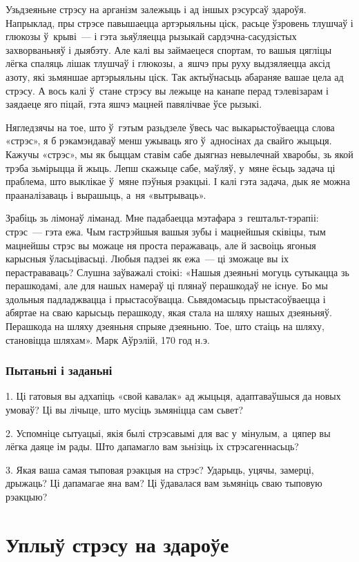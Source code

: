 Узьдзеяньне стрэсу на арганізм залежыць і ад іншых рэсурсаў здароўя. Напрыклад, пры стрэсе павышаецца артэрыяльны ціск, расьце ўзровень тлушчаў і глюкозы ў~крыві~--- і гэта зьяўляецца рызыкай сардэчна-сасудзістых захворваньняў і дыябэту. Але калі вы займаецеся спортам, то вашыя цягліцы лёгка спаляць лішак тлушчаў і глюкозы, а~яшчэ пры руху выдзяляецца аксід азоту, які зьмяншае артэрыяльны ціск. Так актыўнасьць абараняе вашае цела ад стрэсу. А вось калі ў~стане стрэсу вы лежыце на канапе перад тэлевізарам і заядаеце яго піцай, гэта яшчэ мацней павялічвае ўсе рызыкі.

Нягледзячы на тое, што ў~гэтым разьдзеле ўвесь час выкарыстоўваецца слова «стрэс», я б рэкамэндаваў менш ужываць яго ў~адносінах да свайго жыцьця. Кажучы «стрэс», мы як быццам ставім сабе дыягназ невылечнай хваробы, зь якой трэба зьмірыцца й жыць. Лепш скажыце сабе, маўляў, у~мяне ёсьць задача ці праблема, што выклікае ў~мяне пэўныя рэакцыі. І калі гэта задача, дык яе можна прааналізаваць і вырашыць, а~ня «вытрываць».

Зрабіць зь лімонаў ліманад. Мне падабаецца мэтафара з~гештальт-тэрапіі: стрэс~--- гэта ежа. Чым гастрэйшыя вашыя зубы і мацнейшыя сківіцы, тым мацнейшы стрэс вы можаце ня проста перажаваць, але й засвоіць ягоныя карысныя ўласьцівасьці. Любыя падзеі як ежа~--- ці зможаце вы іх перастрававаць? Слушна заўважалі стоікі: «Нашыя дзеяньні могуць сутыкацца зь перашкодамі, але для нашых намераў ці плянаў перашкодаў не існуе. Бо мы здольныя падладжвацца і прыстасоўвацца. Сьвядомасьць прыстасоўваецца і абяртае на сваю карысьць перашкоду, якая стала на шляху нашых дзеяньняў. Перашкода на шляху дзеяньня спрыяе дзеяньню. Тое, што стаіць на шляху, становіцца шляхам». Марк Аўрэлій, 170 год н.э.

\subsubsection{Пытаньні і заданьні}

1. Ці гатовыя вы адхапіць «свой кавалак» ад жыцьця, адаптаваўшыся да новых умоваў? Ці вы лічыце, што мусіць зьмяніцца сам сьвет?

2. Успомніце сытуацыі, якія былі стрэсавымі для вас у~мінулым, а~цяпер вы лёгка даяце ім рады. Што дапамагло вам зьнізіць іх стрэсагеннасьць?

3. Якая ваша самая тыповая рэакцыя на стрэс? Ударыць, уцячы, замерці, дрыжаць? Ці дапамагае яна вам? Ці ўдавалася вам зьмяніць сваю тыповую рэакцыю?


\section{Уплыў стрэсу на здароўе}

